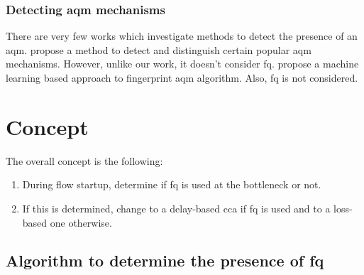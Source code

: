 \documentclass[runningheads]{llncs}
\begin{document}
\subsubsection{Detecting \gls{aqm} mechanisms} There are very few works which investigate methods to detect the presence of an \gls{aqm}. \cite{kargar_bideh_tada_2016} propose a method to detect and distinguish certain popular \gls{aqm} mechanisms. However, unlike our work, it doesn't consider \gls{fq}. \cite{baykal_detection_2017} propose a machine learning based approach to fingerprint \gls{aqm} algorithm. Also, \gls{fq} is not considered. 

\section{Concept}
\label{sec:concept}

The overall concept is the following:
\begin{enumerate}
\item During flow startup, determine if \gls{fq} is used at the bottleneck or not.
\item If this is determined, change to a delay-based \gls{cca} if \gls{fq} is used and to a loss-based one otherwise.
\end{enumerate}

\subsection{Algorithm to determine the presence of \gls{fq}}

%
%
\end{document}
